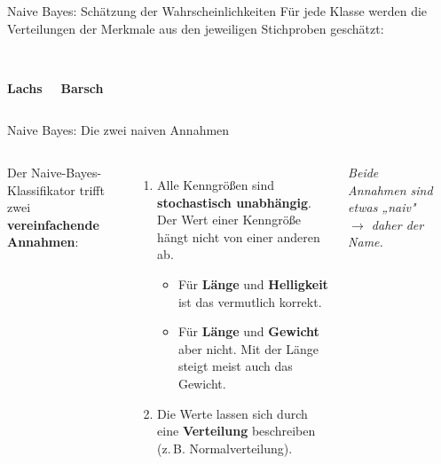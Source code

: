 \begin{frame}{Naive Bayes: Schätzung der Wahrscheinlichkeiten}
Für jede Klasse werden die Verteilungen der Merkmale aus den jeweiligen
Stichproben geschätzt:

\vspace{0.6em}
\begin{columns}
\centering
\\[4pt]
\textbf{Lachs}

\centering
\\[4pt]
\textbf{Barsch}
\end{columns}
\end{frame}


\begin{frame}{Naive Bayes: Die zwei naiven Annahmen}
\begin{columns}
Der Naive-Bayes-Klassifikator trifft zwei \textbf{vereinfachende Annahmen}:

\vspace{0.4em}
\begin{enumerate}[1.]
  \item Alle Kenngrößen sind \textbf{stochastisch unabhängig}. Der Wert
        einer Kenngröße hängt nicht von einer anderen ab.
        \begin{itemize}
          \item Für \textbf{Länge} und \textbf{Helligkeit} ist das vermutlich
                korrekt.
          \item Für \textbf{Länge} und \textbf{Gewicht} aber nicht. Mit der
                Länge steigt meist auch das Gewicht.
        \end{itemize}
  \item Die Werte lassen sich durch eine \textbf{Verteilung} beschreiben
        (z.\,B. Normalverteilung).
\end{enumerate}

\vspace{0.4em}
{\footnotesize\itshape Beide Annahmen sind etwas „naiv" $\rightarrow$ daher der Name.}

\centering
{}\\[6pt]
\\[6pt]
\end{columns}
\end{frame}

